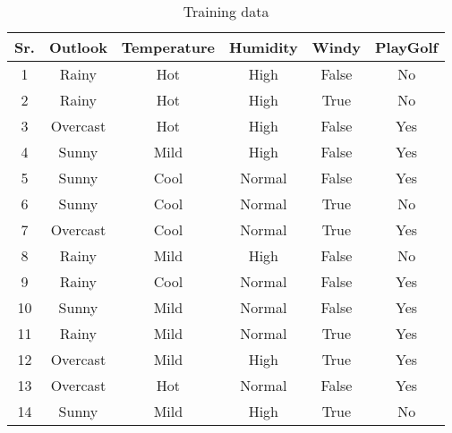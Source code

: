 \documentclass[11pt, a4paper]{article}
\begin{document}
\begin{table}[h!]
	\centering
	\caption{Training data}
	\label{tab:table1}
	\begin{tabular}{c|cccc|c}
		\toprule
		\textbf{Sr.} & \textbf{Outlook} & \textbf{Temperature} & \textbf{Humidity} & \textbf{Windy} & \textbf{PlayGolf} \\
		\midrule
		1            & Rainy            & Hot                  & High              & False          & No                \\
		2            & Rainy            & Hot                  & High              & True           & No                \\
		3            & Overcast         & Hot                  & High              & False          & Yes               \\
		4            & Sunny            & Mild                 & High              & False          & Yes               \\
		5            & Sunny            & Cool                 & Normal            & False          & Yes               \\
		6            & Sunny            & Cool                 & Normal            & True           & No                \\
		7            & Overcast         & Cool                 & Normal            & True           & Yes               \\
		8            & Rainy            & Mild                 & High              & False          & No                \\
		9            & Rainy            & Cool                 & Normal            & False          & Yes               \\
		10           & Sunny            & Mild                 & Normal            & False          & Yes               \\
		11           & Rainy            & Mild                 & Normal            & True           & Yes               \\
		12           & Overcast         & Mild                 & High              & True           & Yes               \\
		13           & Overcast         & Hot                  & Normal            & False          & Yes               \\
		14           & Sunny            & Mild                 & High              & True           & No                \\
		\bottomrule
	\end{tabular}
\end{table}
\end{document}

